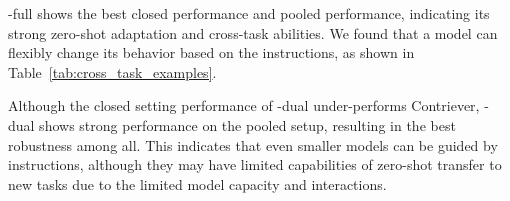 \model-full shows the best closed performance and pooled performance, indicating its strong zero-shot adaptation and cross-task abilities. 
We found that a model can flexibly change its behavior based on the instructions, as shown in Table~\ref{tab:cross_task_examples}. 

{
Although the closed setting performance of \model-dual under-performs Contriever, \model-dual shows strong performance on the pooled setup, resulting in the best robustness among all. }
{This indicates that even smaller models can be guided by instructions, although they may have limited capabilities of zero-shot transfer to new tasks due to the limited model capacity and interactions.}


